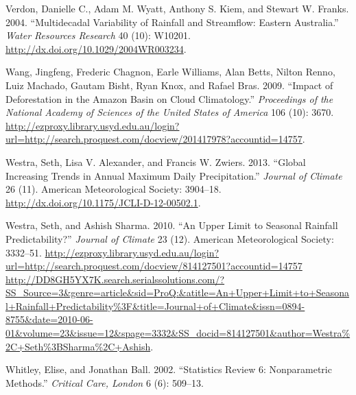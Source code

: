 \documentclass[fleqn,10pt,lineno]{wlpeerj} %
\begin{document}
\hypertarget{ref-Verdon2004}{}
Verdon, Danielle C., Adam M. Wyatt, Anthony S. Kiem, and Stewart W.
Franks. 2004. ``Multidecadal Variability of Rainfall and Streamflow:
Eastern Australia.'' \emph{Water Resources Research} 40 (10): W10201.
\url{http://dx.doi.org/10.1029/2004WR003234}.

\hypertarget{ref-Wang2009}{}
Wang, Jingfeng, Frederic Chagnon, Earle Williams, Alan Betts, Nilton
Renno, Luiz Machado, Gautam Bisht, Ryan Knox, and Rafael Bras. 2009.
``Impact of Deforestation in the Amazon Basin on Cloud Climatology.''
\emph{Proceedings of the National Academy of Sciences of the United
States of America} 106 (10): 3670.
\url{http://ezproxy.library.usyd.edu.au/login?url=http://search.proquest.com/docview/201417978?accountid=14757}.

\hypertarget{ref-Westra2013}{}
Westra, Seth, Lisa V. Alexander, and Francis W. Zwiers. 2013. ``Global
Increasing Trends in Annual Maximum Daily Precipitation.'' \emph{Journal
of Climate} 26 (11). American Meteorological Society: 3904--18.
\url{http://dx.doi.org/10.1175/JCLI-D-12-00502.1}.

\hypertarget{ref-Westra2010}{}
Westra, Seth, and Ashish Sharma. 2010. ``An Upper Limit to Seasonal
Rainfall Predictability?'' \emph{Journal of Climate} 23 (12). American
Meteorological Society: 3332--51.
\href{http://ezproxy.library.usyd.edu.au/login?url=http://search.proquest.com/docview/814127501?accountid=14757\%20http://DD8GH5YX7K.search.serialssolutions.com/?SS_Source=3\&genre=article\&sid=ProQ:\&atitle=An+Upper+Limit+to+Seasonal+Rainfall+Predictability\%3F\&title=Journal+of+Climate\&issn=0894-8755\&date=2010-06-01\&volume=23\&issue=12\&spage=3332\&SS_docid=814127501\&author=Westra\%2C+Seth\%3BSharma\%2C+Ashish}{http://ezproxy.library.usyd.edu.au/login?url=http://search.proquest.com/docview/814127501?accountid=14757 http://DD8GH5YX7K.search.serialssolutions.com/?SS\_Source=3\&genre=article\&sid=ProQ:\&atitle=An+Upper+Limit+to+Seasonal+Rainfall+Predictability\%3F\&title=Journal+of+Climate\&issn=0894-8755\&date=2010-06-01\&volume=23\&issue=12\&spage=3332\&SS\_docid=814127501\&author=Westra\%2C+Seth\%3BSharma\%2C+Ashish}.

\hypertarget{ref-Whitley2002}{}
Whitley, Elise, and Jonathan Ball. 2002. ``Statistics Review 6:
Nonparametric Methods.'' \emph{Critical Care, London} 6 (6): 509--13.
\end{document}
